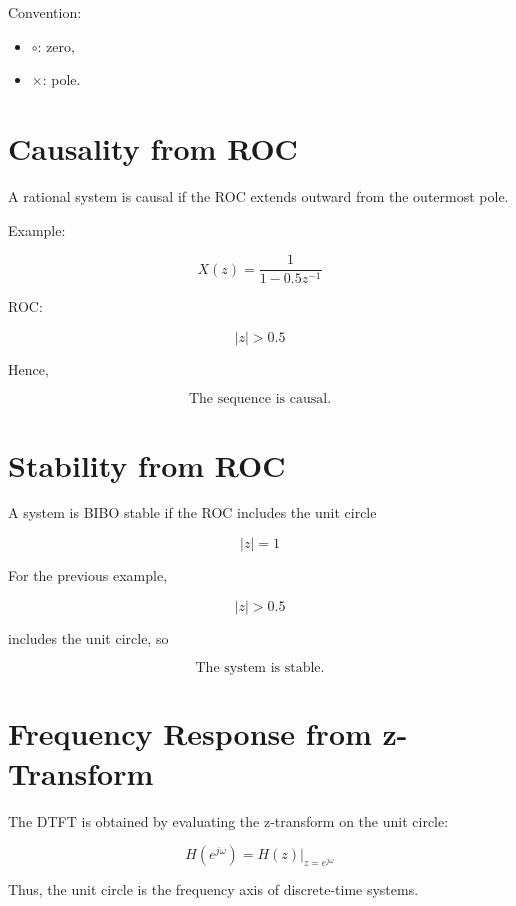 Convention:

\begin{itemize}
\item \(\circ\): zero,
\item \(\times\): pole.
\end{itemize}


\section{Causality from ROC}

A rational system is causal if the ROC extends outward from the outermost pole.

Example:

\[
X(z)=
\frac{1}{1-0.5z^{-1}}
\]

ROC:

\[
|z|>0.5
\]

Hence,

\[
\boxed{
\text{The sequence is causal.}
}
\]


\section{Stability from ROC}

A system is BIBO stable if the ROC includes the unit circle

\[
\boxed{
|z|=1
}
\]

For the previous example,

\[
|z|>0.5
\]

includes the unit circle, so

\[
\boxed{
\text{The system is stable.}
}
\]


\section{Frequency Response from z-Transform}

The DTFT is obtained by evaluating the z-transform on the unit circle:

\[
\boxed{
H(e^{j\omega})=H(z)\big|_{z=e^{j\omega}}
}
\]

Thus, the unit circle is the frequency axis of discrete-time systems.

